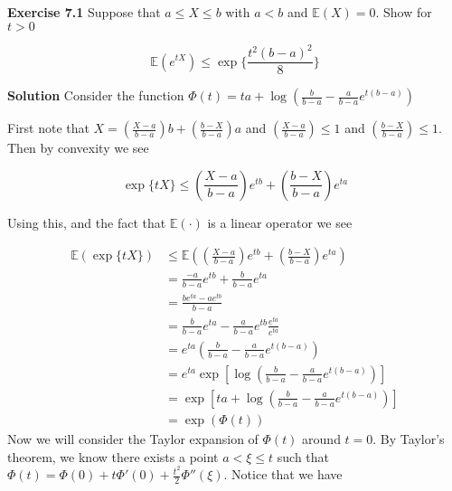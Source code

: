 \documentclass[12pt]{article}  %
\newcommand{\E}{{\mathbb{E}}}
\begin{document}
\textbf{Exercise 7.1} Suppose that $a\leq X \leq b $ with $a<b$ and $\E(X) = 0$. Show for $t>0$

$$\E(e^{tX})\leq \exp\Big\{\frac{t^2(b-a)^2}{8}\Big\}$$

\textbf{Solution} Consider the function $\Phi(t) = ta + \log(\frac{b}{b-a} - \frac{a}{b-a}e^{t(b-a)})$ 

First note that $X = \left(\frac{X-a}{b-a}\right)b + \left(\frac{b-X}{b-a}\right)a$ and $\left(\frac{X-a}{b-a}\right)\leq 1$ and $\left(\frac{b-X}{b-a}\right)\leq 1$. Then by convexity we see 

$$\exp\Big\{tX\Big\}\leq \left(\frac{X-a}{b-a}\right)e^{tb} + \left(\frac{b-X}{b-a}\right)e^{ta}$$

Using this, and the fact that $\E(\cdot)$ is a linear operator we see 

\begin{align*}
\E\left(\exp\Big\{tX\Big\}\right)&\leq \E\left(\left(\frac{X-a}{b-a}\right)e^{tb} + \left(\frac{b-X}{b-a}\right)e^{ta}\right)\\
&= \frac{-a}{b-a}e^{tb} + \frac{b}{b-a}e^{ta}\\
&= \frac{be^{ta} - ae^{tb}}{b-a}\\
&= \frac{b}{b-a}e^{ta} - \frac{a}{b-a}e^{tb}\frac{e^{ta}}{e^{ta}}\\
&= e^{ta}\left(\frac{b}{b-a} - \frac{a}{b-a}e^{t(b-a)}\right)\\
&= e^{ta}\exp\left[\log\left(\frac{b}{b-a} - \frac{a}{b-a}e^{t(b-a)}\right)\right]\\
&= \exp\left[ta + \log\left(\frac{b}{b-a} - \frac{a}{b-a}e^{t(b-a)}\right)\right]\\
&= \exp(\Phi(t))
\end{align*}
Now we will consider the Taylor expansion of $\Phi(t)$ around $t = 0$. By Taylor's theorem, we know there exists a point $a<\xi\leq t$ such that $\Phi(t) = \Phi(0) + t\Phi'(0) + \frac{t^2}{2}\Phi''(\xi)$. Notice that we have 
\end{document}

